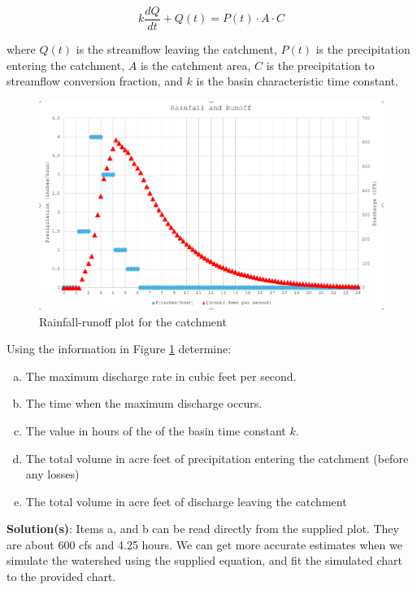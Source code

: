 \documentclass[12pt]{article}
\begin{document}
\begin{enumerate}
\begin{equation}
 k\frac{dQ}{dt} + Q(t) = P(t) \cdot A \cdot C 
\end{equation}

where $Q(t)$ is the streamflow leaving the catchment, $P(t)$ is the precipitation entering the catchment, $A$ is the catchment area, $C$ is the precipitation to streamflow conversion fraction, and $k$ is the basin characteristic time constant.

\begin{figure}[h!] %
   \centering
   \includegraphics[width=6in]{EX1-P2_PLOT.png} 
   \caption{Rainfall-runoff plot for the catchment}
   \label{fig:EX1-P2-PLOT}
\end{figure}

Using the information in Figure \ref{fig:EX1-P2-PLOT} determine:

    \begin{enumerate}[a)]
        \item The maximum discharge rate in cubic feet per second.
        \item The time when the maximum discharge occurs.
        \item The value in hours of the of the basin time constant $k$.
        \item The total volume in acre feet of precipitation entering the catchment (before any losses)
        \item The total volume in acre feet of discharge leaving the catchment 
    \end{enumerate}
\clearpage
\textbf{Solution(s)}:
Items a, and b can be read directly from the supplied plot.  They are about 600 cfs and 4.25 hours.  We can get more accurate estimates when we simulate the watershed using the supplied equation, and fit the simulated chart to the provided chart.


\end{enumerate}
\end{document}
